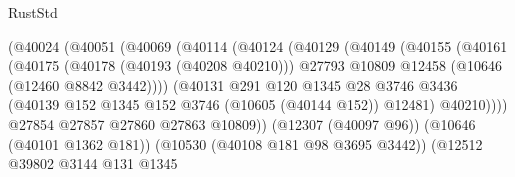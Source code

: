 \begin{lexlean}{RustStd}
\begin{coremodule}
                                      (@40024
                                        (@40051
                                          (@40069
                                            (@40114
                                              (@40124
                                                (@40129
                                                  (@40149
                                                    (@40155
                                                      (@40161
                                                        (@40175
                                                          (@40178 (@40193 (@40208 @40210)))
                                                          @27793
                                                          @10809
                                                          @12458
                                                          (@10646 (@12460 @8842 @3442))))
                                                      (@40131
                                                        @291
                                                        @120
                                                        @1345
                                                        @28
                                                        @3746
                                                        @3436
                                                        (@40139
                                                          @152
                                                          @1345
                                                          @152
                                                          @3746
                                                          (@10605 (@40144 @152))
                                                          @12481)
                                                        @40210))))
                                                @27854
                                                @27857
                                                @27860
                                                @27863
                                                @10809))
                                            (@12307 (@40097 @96))
                                            (@10646 (@40101 @1362 @181))
                                            (@10530 (@40108 @181 @98 @3695 @3442))
                                            (@12512
                                              @39802
                                              @3144
                                              @131
                                              @1345

\end{coremodule}
\end{lexlean}
